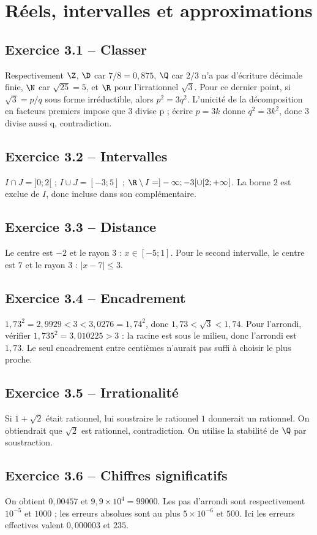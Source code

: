 \chapter{Réels, intervalles et approximations}
\section*{Exercice 3.1 -- Classer}
Respectivement $\Z$, $\D$ car $7/8=0{,}875$, $\Q$ car $2/3$ n'a pas d'écriture décimale finie, $\N$ car $\sqrt{25}=5$, et $\R$ pour l'irrationnel $\sqrt3$. Pour ce dernier point, si $\sqrt3=p/q$ sous forme irréductible, alors $p^2=3q^2$. L'unicité de la décomposition en facteurs premiers impose que $3$ divise p ; écrire $p=3k$ donne $q^2=3k^2$, donc $3$ divise aussi q, contradiction.

\section*{Exercice 3.2 -- Intervalles}
$I\cap J=]0;2[$ ; $I\cup J=[-3;5]$ ; $\R\setminus I=]-\infty;-3[\cup[2;+\infty[$. La borne $2$ est exclue de $I$, donc incluse dans son complémentaire.

\section*{Exercice 3.3 -- Distance}
Le centre est $-2$ et le rayon $3$ : $x\in[-5;1]$. Pour le second intervalle, le centre est $7$ et le rayon $3$ : $|x-7|\leq3$.

\section*{Exercice 3.4 -- Encadrement}
$1{,}73^2=2{,}9929<3<3{,}0276=1{,}74^2$, donc $1{,}73<\sqrt3<1{,}74$. Pour l'arrondi, vérifier $1{,}735^2=3{,}010225>3$ : la racine est sous le milieu, donc l'arrondi est $1{,}73$. Le seul encadrement entre centièmes n'aurait pas suffi à choisir le plus proche.

\section*{Exercice 3.5 -- Irrationalité}
Si $1+\sqrt2$ était rationnel, lui soustraire le rationnel $1$ donnerait un rationnel. On obtiendrait que $\sqrt2$ est rationnel, contradiction. On utilise la stabilité de $\Q$ par soustraction.

\section*{Exercice 3.6 -- Chiffres significatifs}
On obtient $0{,}00457$ et $9{,}9\times10^4=99000$. Les pas d'arrondi sont respectivement $10^{-5}$ et $1000$ ; les erreurs absolues sont au plus $5\times10^{-6}$ et $500$. Ici les erreurs effectives valent $0{,}000003$ et $235$.
